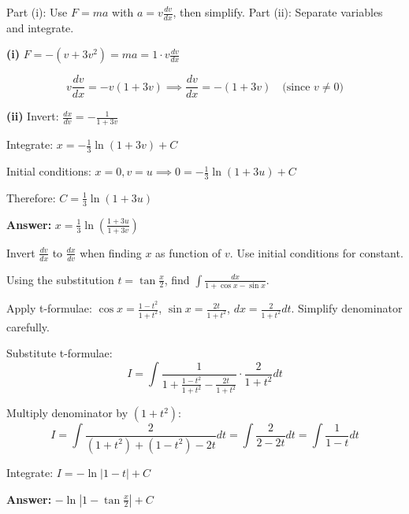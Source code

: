 \begin{hint}
Part (i): Use $F = ma$ with $a = v\frac{dv}{dx}$, then simplify. Part (ii): Separate variables and integrate.
\end{hint}

\begin{solution}
\textbf{(i)} $F = -(v + 3v^2) = ma = 1 \cdot v\frac{dv}{dx}$

\[
v\frac{dv}{dx} = -v(1 + 3v) \implies \frac{dv}{dx} = -(1 + 3v) \quad \text{(since } v \neq 0\text{)}
\]

\textbf{(ii)} Invert: $\frac{dx}{dv} = -\frac{1}{1 + 3v}$

Integrate: $x = -\frac{1}{3}\ln(1 + 3v) + C$

Initial conditions: $x=0, v=u \implies 0 = -\frac{1}{3}\ln(1 + 3u) + C$

Therefore: $C = \frac{1}{3}\ln(1 + 3u)$

\textbf{Answer:} $\boxed{x = \frac{1}{3}\ln\left(\frac{1 + 3u}{1 + 3v}\right)}$
\end{solution}

\begin{takeaways}
Invert $\frac{dv}{dx}$ to $\frac{dx}{dv}$ when finding $x$ as function of $v$. Use initial conditions for constant.
\end{takeaways}

\vspace{1cm}

\begin{problem}
Using the substitution $t = \tan\frac{x}{2}$, find $\displaystyle \int \frac{dx}{1 + \cos x - \sin x}$.
\end{problem}

\begin{hint}
Apply t-formulae: $\cos x = \frac{1-t^2}{1+t^2}$, $\sin x = \frac{2t}{1+t^2}$, $dx = \frac{2}{1+t^2}dt$. Simplify denominator carefully.
\end{hint}

\begin{solution}
Substitute t-formulae:
\[
I = \int \frac{1}{1 + \frac{1-t^2}{1+t^2} - \frac{2t}{1+t^2}} \cdot \frac{2}{1+t^2} dt
\]

Multiply denominator by $(1+t^2)$:
\[
I = \int \frac{2}{(1+t^2) + (1-t^2) - 2t} dt = \int \frac{2}{2 - 2t} dt = \int \frac{1}{1 - t} dt
\]

Integrate: $I = -\ln|1 - t| + C$

\textbf{Answer:} $\boxed{-\ln\left|1 - \tan\frac{x}{2}\right| + C}$
\end{solution}

